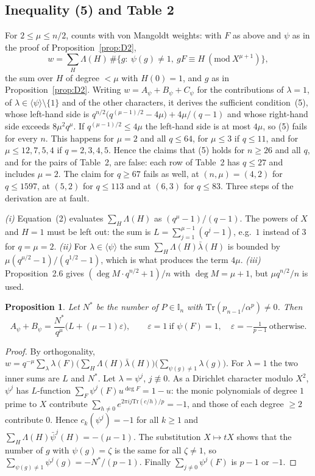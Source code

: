 \documentclass[11pt,a4paper]{amsart}
\newtheorem{proposition}[theorem]{Proposition}
\theoremstyle{remark}
\newcommand{\Tr}{\mathrm{Tr}}
\newcommand{\I}{\mathbb{I}}
\begin{document}
\subsection{Inequality (5) and Table 2}
For $2\le\mu\le n/2$, \cite{K} counts with von Mangoldt weights: with $F$ as above and $\psi$ as in the proof of
Proposition~\ref{prop:D2},
\[
w=\sum_{H}\Lambda(H)\,\#\bigl\{g:\ \psi(g)\ne1,\ gF\equiv H\ (\mathrm{mod}\ X^{\mu+1})\bigr\},
\]
the sum over $H$ of degree $<\mu$ with $H(0)=1$, and $g$ as in Proposition~\ref{prop:D2}. Writing
$w=A_\psi+B_\psi+C_\psi$ for the contributions of $\lambda=1$, of $\lambda\in\langle\psi\rangle\setminus\{1\}$
and of the other characters, it derives the sufficient condition~(5), whose left-hand side is
$q^{n/2}\bigl(q^{(\mu-1)/2}-4\mu\bigr)+4\mu/(q-1)$ and whose right-hand side exceeds $8\mu^2q^\mu$. If
$q^{(\mu-1)/2}\le4\mu$ the left-hand side is at most $4\mu$, so (5) fails for every $n$. This happens for
$\mu=2$ and all $q\le64$, for $\mu\le3$ if $q\le11$, and for $\mu\le12,7,5,4$ if $q=2,3,4,5$. Hence the claims
that (5) holds for $n\ge26$ and all $q$, and for the pairs of Table~2, are false: each row of Table~2 has
$q\le27$ and includes $\mu=2$. The claim for $q\ge67$ fails as well, at $(n,\mu)=(4,2)$ for $q\le1597$, at
$(5,2)$ for $q\le113$ and at $(6,3)$ for $q\le83$. Three steps of the derivation are at fault.

\emph{(i)} Equation~(2) evaluates $\sum_H\Lambda(H)$ as $(q^\mu-1)/(q-1)$. The powers of $X$ and $H=1$ must be
left out: the sum is $L=\sum_{j=1}^{\mu-1}(q^j-1)$, e.g.\ $1$ instead of $3$ for $q=\mu=2$. \emph{(ii)} For
$\lambda\in\langle\psi\rangle$ the sum $\sum_H\Lambda(H)\bar\lambda(H)$ is bounded by
$\mu(q^{\mu/2}-1)/(q^{1/2}-1)$, which is what produces the term $4\mu$. \emph{(iii)} Proposition~2.6 gives
$(\deg M\cdot q^{n/2}+1)/n$ with $\deg M=\mu+1$, but $\mu q^{n/2}/n$ is used.

\begin{proposition}\label{prop:AB}
Let $N^*$ be the number of $P\in\I_n$ with $\Tr(p_{n-1}/\alpha^p)\ne0$. Then
\[
A_\psi+B_\psi=\frac{N^*}{q^\mu}\bigl(L+(\mu-1)\varepsilon\bigr),\qquad
\varepsilon=1\ \text{if }\psi(F)=1,\quad\varepsilon=-\tfrac1{p-1}\ \text{otherwise}.
\]
\end{proposition}
\begin{proof}
By orthogonality, $w=q^{-\mu}\sum_\lambda\lambda(F)\bigl(\sum_H\Lambda(H)\bar\lambda(H)\bigr)\bigl(\sum_{\psi(g)\ne1}\lambda(g)\bigr)$.
For $\lambda=1$ the two inner sums are $L$ and $N^*$. Let $\lambda=\psi^j$, $j\not\equiv0$. As a Dirichlet
character modulo $X^2$, $\psi^j$ has $L$-function $\sum_F\psi^j(F)u^{\deg F}=1-u$: the monic polynomials of
degree $1$ prime to $X$ contribute $\sum_{h\ne0}e^{2\pi ij\Tr(c/h)/p}=-1$, and those of each degree $\ge2$
contribute $0$. Hence $c_k(\psi^j)=-1$ for all $k\ge1$ and $\sum_H\Lambda(H)\bar\psi^j(H)=-(\mu-1)$. The
substitution $X\mapsto tX$ shows that the number of $g$ with $\psi(g)=\zeta$ is the same for all $\zeta\ne1$, so
$\sum_{\psi(g)\ne1}\psi^j(g)=-N^*/(p-1)$. Finally $\sum_{j\ne0}\psi^j(F)$ is $p-1$ or $-1$.
\end{proof}
\end{document}
